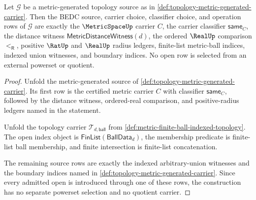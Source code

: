 \begin{theorem}
\label{thm:topology-metric-generated-carrier-scope}
Let $\mathcal{G}$ be a metric-generated topology source as in \autoref{def:topology-metric-generated-carrier}. Then the BEDC source, carrier choice, classifier choice, and operation rows of $\mathcal{G}$ are exactly the $\MetricSpaceUp$ carrier $C$, the carrier classifier $\mathsf{same}_C$, the distance witness $\mathsf{MetricDistanceWitness}(d)$, the ordered $\RealUp$ comparison $<_{\mathsf R}$, positive $\RatUp$ and $\RealUp$ radius ledgers, finite-list metric-ball indices, indexed union witnesses, and boundary indices. No open row is selected from an external powerset or quotient.
\end{theorem}
\begin{proof}
Unfold the metric-generated source of \autoref{def:topology-metric-generated-carrier}. Its first row is the certified metric carrier $C$ with classifier $\mathsf{same}_C$, followed by the distance witness, ordered-real comparison, and positive-radius ledgers named in the statement.

Unfold the topology carrier $\mathcal{T}_{d,\mathsf{ball}}$ from \autoref{def:metric-finite-ball-indexed-topology}. The open index object is $\mathsf{FinList}(\mathsf{BallData}_d)$, the membership predicate is finite-list ball membership, and finite intersection is finite-list concatenation.

The remaining source rows are exactly the indexed arbitrary-union witnesses and the boundary indices named in \autoref{def:topology-metric-generated-carrier}. Since every admitted open is introduced through one of these rows, the construction has no separate powerset selection and no quotient carrier.
\end{proof}

